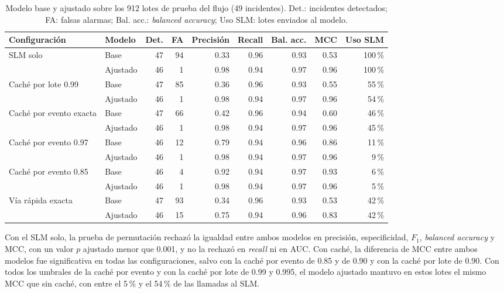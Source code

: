 \begin{table}[H]
\centering
\caption{Modelo base y ajustado sobre los 912 lotes de prueba del flujo (49 incidentes). Det.: incidentes detectados; FA: falsas alarmas; Bal. acc.: \textit{balanced accuracy}; Uso SLM: lotes enviados al modelo.}
\label{tab:res_sim_prueba}
\footnotesize
\setlength{\tabcolsep}{3pt}
\begin{tabular}{@{}llrrrrrrr@{}}
\toprule
\textbf{Configuración} & \textbf{Modelo} & \textbf{Det.} & \textbf{FA} & \textbf{Precisión} & \textbf{Recall} & \textbf{Bal. acc.} & \textbf{MCC} & \textbf{Uso SLM} \\
\midrule
\multirow{2}{*}{SLM solo} & Base & 47 & 94 & 0.33 & 0.96 & 0.93 & 0.53 & 100\,\% \\
 & Ajustado & 46 & 1 & 0.98 & 0.94 & 0.97 & 0.96 & 100\,\% \\
\multirow{2}{*}{Caché por lote 0.99} & Base & 47 & 85 & 0.36 & 0.96 & 0.93 & 0.55 & 55\,\% \\
 & Ajustado & 46 & 1 & 0.98 & 0.94 & 0.97 & 0.96 & 54\,\% \\
\multirow{2}{*}{Caché por evento exacta} & Base & 47 & 66 & 0.42 & 0.96 & 0.94 & 0.60 & 46\,\% \\
 & Ajustado & 46 & 1 & 0.98 & 0.94 & 0.97 & 0.96 & 45\,\% \\
\multirow{2}{*}{Caché por evento 0.97} & Base & 46 & 12 & 0.79 & 0.94 & 0.96 & 0.86 & 11\,\% \\
 & Ajustado & 46 & 1 & 0.98 & 0.94 & 0.97 & 0.96 & 9\,\% \\
\multirow{2}{*}{Caché por evento 0.85} & Base & 46 & 4 & 0.92 & 0.94 & 0.97 & 0.93 & 6\,\% \\
 & Ajustado & 46 & 1 & 0.98 & 0.94 & 0.97 & 0.96 & 5\,\% \\
\multirow{2}{*}{Vía rápida exacta} & Base & 47 & 93 & 0.34 & 0.96 & 0.93 & 0.53 & 42\,\% \\
 & Ajustado & 46 & 15 & 0.75 & 0.94 & 0.96 & 0.83 & 42\,\% \\
\bottomrule
\end{tabular}
\normalsize
\end{table}

Con el SLM solo, la prueba de permutación rechazó la igualdad entre ambos modelos en precisión, especificidad, $F_1$, \textit{balanced accuracy} y MCC, con un valor $p$ ajustado menor que 0.001, y no la rechazó en \textit{recall} ni en AUC. Con caché, la diferencia de MCC entre ambos modelos fue significativa en todas las configuraciones, salvo con la caché por evento de 0.85 y de 0.90 y con la caché por lote de 0.90. Con todos los umbrales de la caché por evento y con la caché por lote de 0.99 y 0.995, el modelo ajustado mantuvo en estos lotes el mismo MCC que sin caché, con entre el 5\,\% y el 54\,\% de las llamadas al SLM.

